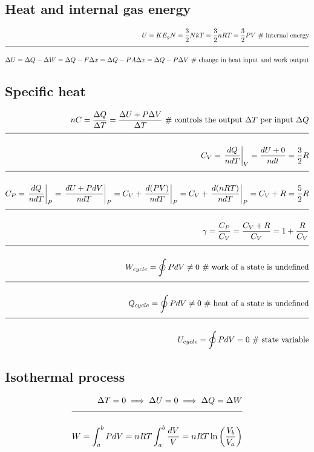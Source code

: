 \documentclass[a4paper]{article}
\newcommand{\eqComment}[1]{\text{  \# #1}}
\newcommand{\n}{\\[1.5ex] \hline \nonumber \\[0ex]}
\begin{document}
\subsection{Heat and internal gas energy}
\begin{tcolorbox}
\begin{align}
   U = KE_g N = \frac{3}{2} N k T = \frac{3}{2} n R T = \frac{3}{2} P V \eqComment{internal energy}
\n \Delta U = \Delta Q - \Delta W = \Delta Q - F \Delta x = \Delta Q - P A \Delta x = \Delta Q - P \Delta V \eqComment{change in heat input and work output}
\end{align}
\end{tcolorbox}

\subsection{Specific heat}
\begin{tcolorbox}
\begin{align}
   n C = \frac{\Delta Q}{\Delta T} = \frac{\Delta U + P \Delta V}{\Delta T} \eqComment{controls the output $\Delta T$ per input $\Delta Q$}	
\n C_V = \left.\frac{dQ}{n dT}\right|_V = \frac{dU+0}{n dt} = \frac{3}{2} R
\n C_P = \left.\frac{dQ}{n dT}\right|_P = \left.\frac{dU + P dV}{n dT}\right|_P = C_V + \left.\frac{d(PV)}{n dT}\right|_P = C_V + \left.\frac{d(n R T)}{n dT}\right|_P = C_V + R = \frac{5}{2} R
\n \gamma = \frac{C_P}{C_V} = \frac{C_V + R}{C_V} = 1 + \frac{R}{C_V}
\n W_{cycle} = \oint P dV \neq 0 \eqComment{work of a state is undefined}
\n Q_{cycle} = \oint P dV \neq 0 \eqComment{heat of a state is undefined}
\n U_{cycle} = \oint P dV = 0 \eqComment{state variable}
\end{align}
\end{tcolorbox}

\subsection{Isothermal process}
\begin{tcolorbox}
\begin{align}
   \Delta T = 0 \implies \Delta  U = 0 \implies \Delta Q = \Delta W
\n W = \int_a^b P dV = n R T \int_a^b \frac{dV}{V} = n R T \ln\left(\frac{V_b}{V_a}\right)
\end{align}
\end{tcolorbox}
\end{document}
